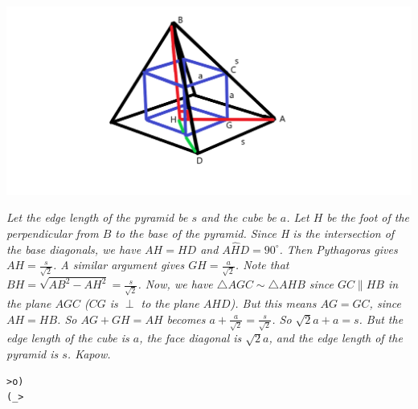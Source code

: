 \documentclass{article}
\begin{document}
\begin{enumerate}[1.]
\begin{center}
\includegraphics[scale=0.5]{pyramid.png}
\end{center}
{\itshape Let the edge length of the pyramid be $s$ and the cube be $a$. Let $H$ be the foot of the perpendicular from $B$ to the base of the pyramid. Since H is the intersection of the base diagonals, we have $AH=HD$ and $A\hat{H}D=90^{\circ}$. Then Pythagoras gives $AH=\frac{s}{\sqrt{2}}$. A similar argument gives $GH=\frac{a}{\sqrt{2}}$. Note that $BH=\sqrt{AB^2-AH^2}=\frac{s}{\sqrt{2}}$. Now, we have $\triangle AGC \sim \triangle AHB$ since $GC\parallel HB$ in the plane $AGC$ ($CG$ is $\perp$ to the plane $AHD$). But this means $AG=GC$, since $AH=HB$. So $AG+GH=AH$ becomes $a+\frac{a}{\sqrt{2}}=\frac{s}{\sqrt{2}}$. So $\sqrt{2}a+a=s$. But the edge length of the cube is ${a}$, the face diagonal is $\sqrt{2}a$, and the edge length of the pyramid is $s$. Kapow.}

\end{enumerate}


\vfill
\centering
\begin{BVerbatim}
>o)
(_>
\end{BVerbatim}
\end{document}
